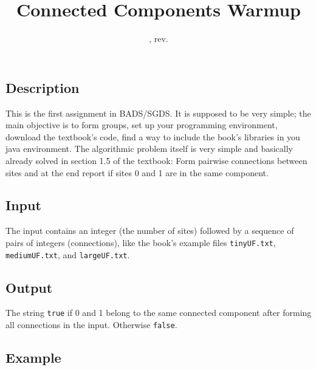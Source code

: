 \documentclass{tufte-handout}
\title{Connected Components Warmup}
\date{\GITAuthorDate, rev. \GITAbrHash}
\author{}
\begin{document}
\maketitle

\subsection{Description}

This is the first assignment in BADS/SGDS. 
It is supposed to be very simple; the main objective is to form groups, set up your programming environment, download the textbook's code, find a way to include the book's libraries in you java environment.
The algorithmic problem itself is very simple and basically already solved in section 1.5 of the textbook:
Form pairwise connections between sites and at the end report if sites 0 and 1 are in the same component.

\subsection{Input}

The input contains an integer (the number of sites) followed by a sequence of pairs of integers (connections), like the book's example files {\tt tinyUF.txt}, {\tt mediumUF.txt}, and {\tt largeUF.txt}.


\subsection{Output}

The string {\tt true} if 0 and 1 belong to the same connected component after forming all connections in the input. 
Otherwise {\tt false}.

\subsection{Example}
\end{document}
